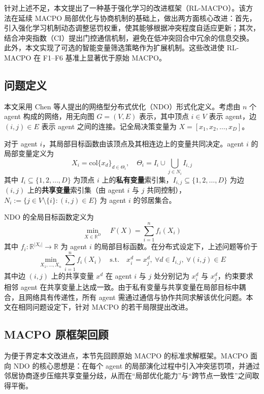 \documentclass[12pt]{ctexart}
\begin{document}
针对上述不足，本文提出了一种基于强化学习的改进框架（RL-MACPO）。该方法在延续 MACPO 局部优化与协商机制的基础上，做出两方面核心改进：首先，引入强化学习机制动态调整惩罚权重，使其能够根据冲突程度自适应更新；其次，结合冲突指数（CI）提出门控通信机制，避免在低冲突回合中冗余的信息交换。此外，本文实现了可选的智能变量筛选策略作为扩展机制。这些改进使 RL-MACPO 在 F1--F6 基准上显著优于原始 MACPO。


\subsection{问题定义}\label{ux95eeux9898ux5b9aux4e49}

本文采用 Chen 等人提出的网络型分布式优化（NDO）形式化定义。考虑由 \(n\) 个 agent 构成的网络，用无向图 \(G = (V, E)\) 表示，其中顶点 \(i \in V\) 表示 agent，边 \((i, j) \in E\) 表示 agent 之间的连接。记全局决策变量为 \(X = [x_1, x_2, \ldots, x_D]\)。

对于 agent \(i\)，其局部目标函数由该顶点及其相连边上的变量共同决定。agent \(i\) 的局部变量定义为
\[
X_i = \mathrm{col}\{x_d\}_{d \in \Theta_i}, \quad \Theta_i = I_i \cup \bigcup_{j \in N_i} I_{i,j}
\]
其中 \(I_i \subseteq \{1, 2, \ldots, D\}\) 为顶点 \(i\) 上的\textbf{私有变量}索引集，\(I_{i,j} \subseteq \{1, 2, \ldots, D\}\) 为边 \((i,j)\) 上的\textbf{共享变量}索引集（由 agent \(i\) 与 \(j\) 共同控制），\(N_i := \{j \in V \setminus \{i\} : (i,j) \in E\}\) 为 agent \(i\) 的邻居集合。

NDO 的全局目标函数定义为
\[
\min_{X \in \mathbb{R}^D} \quad F(X) = \sum_{i=1}^{n} f_i(X_i)
\]
其中 \(f_i : \mathbb{R}^{|X_i|} \to \mathbb{R}\) 为 agent \(i\) 的局部目标函数。在分布式设定下，上述问题等价于
\[
\min_{X_1, \ldots, X_n} \sum_{i=1}^{n} f_i(X_i) \quad \text{s.t.} \quad x_i^d = x_j^d,\ \forall d \in I_{i,j},\ \forall (i,j) \in E
\]
其中边 \((i,j)\) 上的共享变量 \(x^d\) 在 agent \(i\) 与 \(j\) 处分别记为 \(x_i^d\) 与 \(x_j^d\)，约束要求相邻 agent 在共享变量上达成一致。由于私有变量与共享变量在局部目标中耦合，且网络具有传递性，所有 agent 需通过通信与协作共同求解该优化问题。本文在相同问题设定下，针对 MACPO 的若干局限提出改进。

\subsection{MACPO 原框架回顾}\label{sec:macpo_prelim}

为便于界定本文改进点，本节先回顾原始 MACPO 的标准求解框架。MACPO 面向 NDO 的核心思想是：在每个 agent 的局部演化过程中引入冲突惩罚项，并通过邻居协商逐步压缩共享变量分歧，从而在“局部优化能力”与“跨节点一致性”之间取得平衡。
\end{document}
